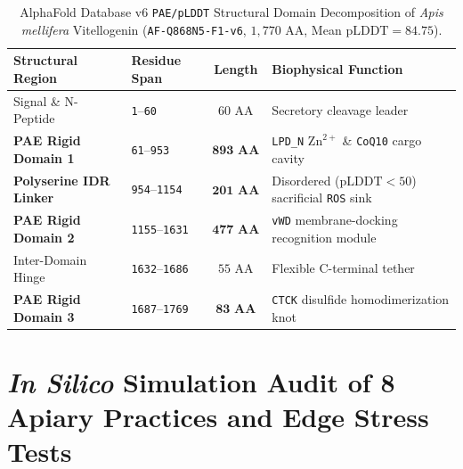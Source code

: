 \documentclass[11pt]{article}
\begin{document}
\begin{table}[t]
\centering
\caption{AlphaFold Database v6 \texttt{PAE/pLDDT} Structural Domain Decomposition of \textit{Apis mellifera} Vitellogenin (\texttt{AF-Q868N5-F1-v6}, $1{,}770\text{ AA}$, Mean $\mathrm{pLDDT}=84.75$).}
\label{tab:vg_domains}
\small
\begin{tabular}{@{}llcl@{}}
\toprule
\textbf{Structural Region} & \textbf{Residue Span} & \textbf{Length} & \textbf{Biophysical Function} \\
\midrule
Signal \& N-Peptide & \texttt{1}--\texttt{60} & $60\text{ AA}$ & Secretory cleavage leader \\
\textbf{PAE Rigid Domain 1} & \texttt{61}--\texttt{953} & $\mathbf{893\text{ AA}}$ & \texttt{LPD\_N} $\mathrm{Zn}^{2+}$ \& \texttt{CoQ10} cargo cavity \\
\textbf{Polyserine IDR Linker} & \texttt{954}--\texttt{1154} & $\mathbf{201\text{ AA}}$ & Disordered ($\mathrm{pLDDT}<50$) sacrificial \texttt{ROS} sink \\
\textbf{PAE Rigid Domain 2} & \texttt{1155}--\texttt{1631} & $\mathbf{477\text{ AA}}$ & \texttt{vWD} membrane-docking recognition module \\
Inter-Domain Hinge & \texttt{1632}--\texttt{1686} & $55\text{ AA}$ & Flexible C-terminal tether \\
\textbf{PAE Rigid Domain 3} & \texttt{1687}--\texttt{1769} & $\mathbf{83\text{ AA}}$ & \texttt{CTCK} disulfide homodimerization knot \\
\bottomrule
\end{tabular}
\end{table}

\section{\textit{In Silico} Simulation Audit of 8 Apiary Practices and Edge Stress Tests}
\end{document}
